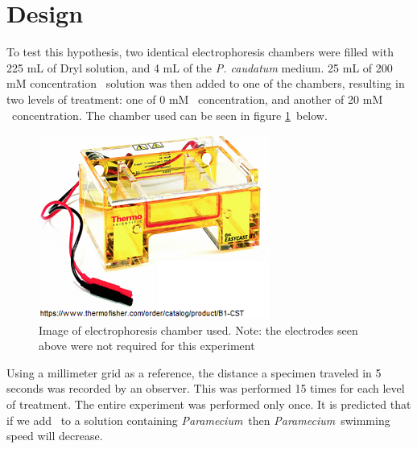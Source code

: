 \documentclass[12pt]{article}
\newcommand{\p}{\textit{Paramecium}}
\newcommand{\kcl}{\ce{KCl}}
\begin{document}
\section{Design}
	
	To test this hypothesis, two identical electrophoresis chambers were filled with 225 mL of Dryl solution, and 4 mL of the \textit{P. caudatum} medium. 25 mL of 200 mM concentration \kcl\ solution was then added to one of the chambers, resulting in two levels of treatment: one of 0 mM \kcl\ concentration, and another of 20 mM \kcl\ concentration. The chamber used can be seen in figure \ref{chamber}\ below.
	
	
	\begin{figure}[h]
		\centering
		\includegraphics{chamber.png}
		\caption{Image of electrophoresis chamber used. Note: the electrodes seen above were not required for this experiment}
		\label{chamber}
	\end{figure}
	
	\noindent
	Using a millimeter grid as a reference, the distance a specimen traveled in 5 seconds was recorded by an observer. This was performed 15 times for each level of treatment. The entire experiment was performed only once. It is predicted that if we add \kcl\ to a solution containing \p\, then \p\ swimming speed will decrease.
	
\end{document}
